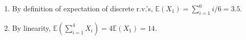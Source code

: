 
\setcounter{theorem}{2}
\begin{exercise} [BH.4.3]
\begin{solution}
    \begin{enumerate}
	    \item By definition of expectation of discrete r.v.'s, $\mathbb{E}(X_1)=\sum_{i=1}^{6} i/6 =3.5$. 
		\item By linearity, $\mathbb{E}(\sum_{i=1}^4 X_i) =4\mathbb{E}(X_1)= 14$.  
	\end{enumerate}
\end{solution}
\end{exercise}


